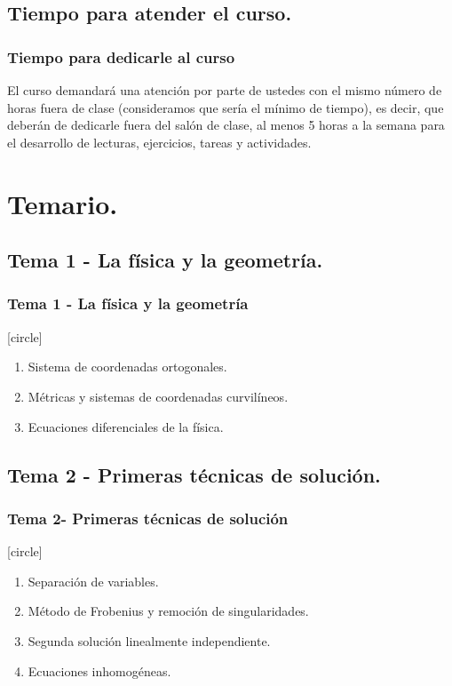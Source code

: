 \subsection{Tiempo para atender el curso.}
\begin{frame}
\frametitle{Tiempo para dedicarle al curso}
El curso demandará una atención por parte de ustedes con el mismo número de horas fuera de clase (consideramos que sería el mínimo de tiempo), es decir, que deberán de dedicarle fuera del salón de clase, al menos 5 horas a la semana para el desarrollo de lecturas, ejercicios, tareas y actividades.
\end{frame}
\section{Temario.}
\subsection{Tema 1 - La física y la geometría.}
\begin{frame}
\frametitle{Tema 1 - La física y la geometría}
[circle]
\begin{enumerate}[<+->]
\item Sistema de coordenadas ortogonales.
\item Métricas y sistemas de coordenadas curvilíneos.
\item Ecuaciones diferenciales de la física.
\end{enumerate}
\end{frame}
\subsection{Tema 2 - Primeras técnicas de solución.}
\begin{frame}
\frametitle{Tema 2- Primeras técnicas de solución}
[circle]
\begin{enumerate}[<+->]
\item Separación de variables.
\item Método de Frobenius y remoción de singularidades.
\item Segunda solución linealmente independiente.
\item Ecuaciones inhomogéneas.  
\end{enumerate}
\end{frame}
